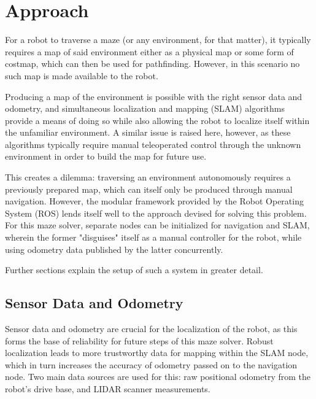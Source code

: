 \documentclass{article}
\begin{document}
\section{Approach}

For a robot to traverse a maze (or any environment, for that matter), it typically requires a map of said environment either as a physical map or some form of costmap, which can then be used for pathfinding. However, in this scenario no such map is made available to the robot. 

Producing a map of the environment is possible with the right sensor data and odometry, and simultaneous localization and mapping (SLAM) algorithms provide a means of doing so while also allowing the robot to localize itself within the unfamiliar environment. A similar issue is raised here, however, as these algorithms typically require manual teleoperated control through the unknown environment in order to build the map for future use. 

This creates a dilemma: traversing an environment autonomously requires a previously prepared map, which can itself only be produced through manual navigation. However, the modular framework provided by the Robot Operating System (ROS) lends itself well to the approach devised for solving this problem. For this maze solver, separate nodes can be initialized for navigation and SLAM, wherein the former "disguises" itself as a manual controller for the robot, while using odometry data published by the latter concurrently.

Further sections explain the setup of such a system in greater detail.

\subsection{Sensor Data and Odometry}

Sensor data and odometry are crucial for the localization of the robot, as this forms the base of reliability for future steps of this maze solver. Robust localization leads to more trustworthy data for mapping within the SLAM node, which in turn increases the accuracy of odometry passed on to the navigation node. Two main data sources are used for this: raw positional odometry from the robot's drive base, and LIDAR scanner measurements. 
\end{document}
